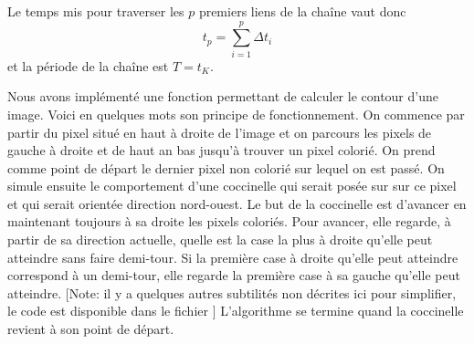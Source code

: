 Le temps mis pour traverser les $p$ premiers liens de la chaîne vaut donc 
\[
t_p = \sum_{i = 1}^{p} \Delta t_i
\]
et la période de la chaîne est $T = t_K$.


Nous avons implémenté une fonction permettant de calculer le 
contour d'une image.
Voici en quelques mots son principe de fonctionnement. 
On commence par partir du pixel situé en haut à droite de l'image 
et on parcours les pixels de gauche à droite et de haut an bas 
jusqu'à trouver un pixel colorié. 
On prend comme point de départ le dernier pixel non colorié sur lequel 
on est passé.
On simule ensuite le comportement d'une coccinelle qui serait posée sur 
sur ce pixel et qui serait orientée direction nord-ouest. 
Le but de la coccinelle est d'avancer en maintenant toujours à sa 
droite les pixels coloriés. 
Pour avancer, elle regarde, à partir de sa direction actuelle, quelle 
est la case la plus à droite qu'elle peut atteindre sans faire demi-tour.
Si la première case à droite qu'elle peut atteindre correspond à un demi-tour, 
elle regarde la première case à sa gauche qu'elle peut atteindre.
[Note: il y a quelques autres subtilités non décrites ici pour simplifier, 
le code est disponible dans le fichier ]
L'algorithme se termine quand la coccinelle revient à son point de départ.

